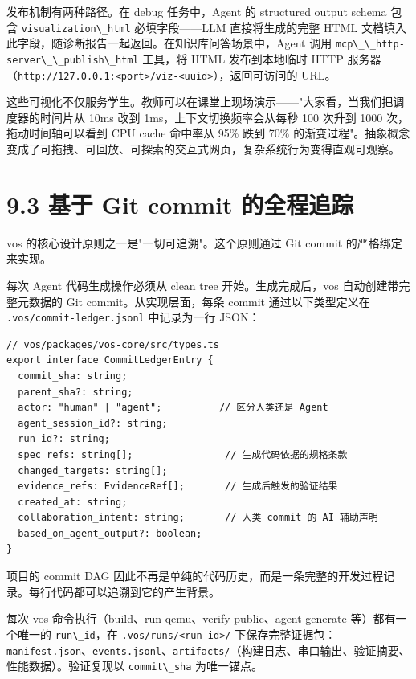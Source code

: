 \documentclass[UTF8,a4paper,12pt,openany]{ctexrep}
\newcommand{\passthrough}[1]{#1}
\begin{document}
发布机制有两种路径。在 debug 任务中，Agent 的 structured output schema 包含 \passthrough{\lstinline!visualization\_html!} 必填字段------LLM 直接将生成的完整 HTML 文档填入此字段，随诊断报告一起返回。在知识库问答场景中，Agent 调用 \passthrough{\lstinline!mcp\_\_http-server\_\_publish\_html!} 工具，将 HTML 发布到本地临时 HTTP 服务器（\passthrough{\lstinline!http://127.0.0.1:<port>/viz-<uuid>!}），返回可访问的 URL。

这些可视化不仅服务学生。教师可以在课堂上现场演示------"大家看，当我们把调度器的时间片从 10ms 改到 1ms，上下文切换频率会从每秒 100 次升到 1000 次，拖动时间轴可以看到 CPU cache 命中率从 95\% 跌到 70\% 的渐变过程"。抽象概念变成了可拖拽、可回放、可探索的交互式网页，复杂系统行为变得直观可观察。

\section{9.3 基于 Git commit 的全程追踪}\label{93-ux57faux4e8e-git-commit-ux7684ux5168ux7a0bux8ffdux8e2a}

vos 的核心设计原则之一是"一切可追溯"。这个原则通过 Git commit 的严格绑定来实现。

每次 Agent 代码生成操作必须从 clean tree 开始。生成完成后，vos 自动创建带完整元数据的 Git commit。从实现层面，每条 commit 通过以下类型定义在 \passthrough{\lstinline!.vos/commit-ledger.jsonl!} 中记录为一行 JSON：

\begin{lstlisting}
// vos/packages/vos-core/src/types.ts
export interface CommitLedgerEntry {
  commit_sha: string;
  parent_sha?: string;
  actor: "human" | "agent";          // 区分人类还是 Agent
  agent_session_id?: string;
  run_id?: string;
  spec_refs: string[];                // 生成代码依据的规格条款
  changed_targets: string[];
  evidence_refs: EvidenceRef[];       // 生成后触发的验证结果
  created_at: string;
  collaboration_intent: string;       // 人类 commit 的 AI 辅助声明
  based_on_agent_output?: boolean;
}
\end{lstlisting}

项目的 commit DAG 因此不再是单纯的代码历史，而是一条完整的开发过程记录。每行代码都可以追溯到它的产生背景。

每次 vos 命令执行（build、run qemu、verify public、agent generate 等）都有一个唯一的 \passthrough{\lstinline!run\_id!}，在 \passthrough{\lstinline!.vos/runs/<run-id>/!} 下保存完整证据包：\passthrough{\lstinline!manifest.json!}、\passthrough{\lstinline!events.jsonl!}、\passthrough{\lstinline!artifacts/!}（构建日志、串口输出、验证摘要、性能数据）。验证复现以 \passthrough{\lstinline!commit\_sha!} 为唯一锚点。
\end{document}
